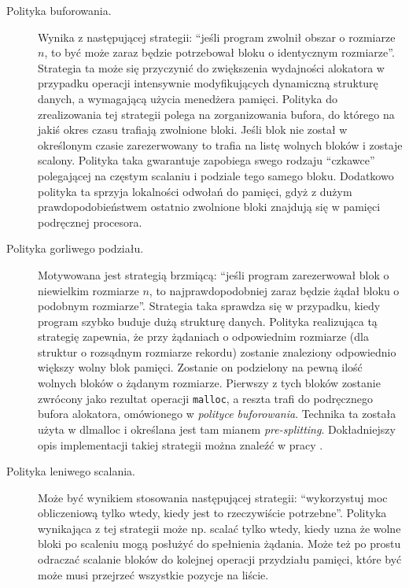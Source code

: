 \documentclass[12pt,a4paper,titlepage,twoside]{mwart}
\begin{document}
\begin{description}
\item[Polityka buforowania.] Wynika z następującej strategii: ``jeśli program
zwolnił obszar o rozmiarze $n$, to być może zaraz będzie potrzebował bloku o
identycznym rozmiarze''. Strategia ta może się przyczynić do zwiększenia
wydajności alokatora w przypadku operacji intensywnie modyfikujących
dynamiczną strukturę danych, a wymagającą użycia menedżera pamięci. Polityka do
zrealizowania tej strategii polega na zorganizowania bufora, do którego na
jakiś okres czasu trafiają zwolnione bloki. Jeśli blok nie został w określonym
czasie zarezerwowany to trafia na listę wolnych bloków i zostaje scalony.
Polityka taka gwarantuje zapobiega swego rodzaju ``czkawce'' polegającej na
częstym scalaniu i podziale tego samego bloku. Dodatkowo polityka ta sprzyja
lokalności odwołań do pamięci, gdyż z dużym prawdopodobieństwem ostatnio
zwolnione bloki znajdują się w pamięci podręcznej procesora.
\vspace{1ex}

\item[Polityka gorliwego podziału.] Motywowana jest strategią brzmiącą: ``jeśli
program zarezerwował blok o niewielkim rozmiarze $n$, to najprawdopodobniej
zaraz będzie żądał bloku o podobnym rozmiarze''. Strategia taka sprawdza się w
przypadku, kiedy program szybko buduje dużą strukturę danych. Polityka
realizująca tą strategię zapewnia, że przy żądaniach o odpowiednim rozmiarze
(dla struktur o rozsądnym rozmiarze rekordu) zostanie znaleziony odpowiednio
większy wolny blok pamięci. Zostanie on podzielony na pewną ilość wolnych
bloków o żądanym rozmiarze. Pierwszy z tych bloków zostanie zwrócony jako
rezultat operacji \texttt{malloc}, a reszta trafi do podręcznego bufora
alokatora, omówionego w \textit{polityce buforowania}. Technika ta została
użyta w dlmalloc \cite{douglea96malloc} i określana jest tam mianem
\textit{pre-splitting}. Dokładniejszy opis implementacji takiej strategii można
znaleźć w pracy \cite{weinstock88quickfit}.
\vspace{1ex}

\item[Polityka leniwego scalania.] Może być wynikiem stosowania następującej
strategii: ``wykorzystuj moc obliczeniową tylko wtedy, kiedy jest to
rzeczywiście potrzebne''. Polityka wynikająca z tej strategii może np. scalać
tylko wtedy, kiedy uzna że wolne bloki po scaleniu mogą posłużyć do spełnienia
żądania. Może też po prostu odraczać scalanie bloków do kolejnej operacji
przydziału pamięci, które być może musi przejrzeć wszystkie pozycje na liście.
\end{description}
\end{document}
